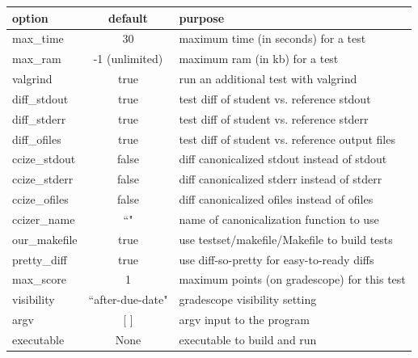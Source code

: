 \documentclass[11pt]{report}
\begin{document}
\begin{tabular}{ | l | c | l | }
\hline			
\textbf{option} & \textbf{default} & \textbf{purpose} \\ \hline\hline
max\_time & 30 & maximum time (in seconds) for a test \\\hline
max\_ram & -1 (unlimited) & maximum ram (in kb) for a test \\\hline
valgrind & true & run an additional test with valgrind \\\hline
diff\_stdout & true & test diff of student vs. reference stdout \\\hline
diff\_stderr & true & test diff of student vs. reference stderr \\\hline
diff\_ofiles & true & test diff of student vs. reference output files \\\hline
ccize\_stdout & false & diff canonicalized stdout instead of stdout \\\hline
ccize\_stderr & false & diff canonicalized stderr instead of stderr \\\hline
ccize\_ofiles & false & diff canonicalized ofiles instead of ofiles \\\hline
ccizer\_name & ``" & name of canonicalization function to use \\\hline
our\_makefile & true & use testset/makefile/Makefile to build tests \\\hline
pretty\_diff & true & use diff-so-pretty for easy-to-ready diffs \\\hline
max\_score & 1 & maximum points (on gradescope) for this test \\\hline
visibility &``after-due-date" & gradescope visibility setting \\\hline
argv & [ ] & argv input to the program \\\hline
executable & None & executable to build and run \\\hline
\end{tabular}
\newpage
\end{document}
